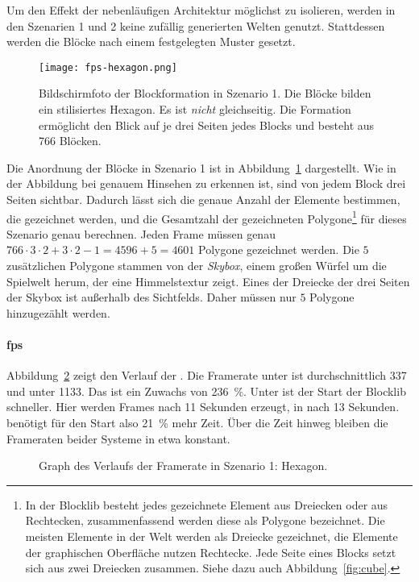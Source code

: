
Um den Effekt der nebenläufigen Architektur möglichst zu isolieren, werden in den Szenarien 1 und 2 keine zufällig generierten Welten genutzt. Stattdessen werden die Blöcke nach einem festgelegten Muster gesetzt.

\begin{figure}
	\centering
	\texttt{[image: fps-hexagon.png]}
	\caption[Bildschirmfoto der Blockformation in Szenario 1 der Performanceanalyse.]{Bildschirmfoto der Blockformation in Szenario 1. Die Blöcke bilden ein stilisiertes Hexagon. Es ist \emph{nicht} gleichseitig. Die Formation ermöglicht den Blick auf je drei Seiten jedes Blocks und besteht aus 766 Blöcken.}\label{fig:hexagon}
\end{figure}
Die Anordnung der Blöcke in Szenario 1 ist in Abbildung~\ref{fig:hexagon} dargestellt. Wie in der Abbildung bei genauem Hinsehen zu erkennen ist, sind von jedem Block drei Seiten sichtbar. Dadurch lässt sich die genaue Anzahl der Elemente bestimmen, die gezeichnet werden, und die Gesamtzahl der gezeichneten Polygone\footnote{In der Blocklib besteht jedes gezeichnete Element aus Dreiecken oder aus Rechtecken, zusammenfassend werden diese als Polygone bezeichnet. Die meisten Elemente in der Welt werden als Dreiecke gezeichnet, die Elemente der graphischen Oberfläche nutzen Rechtecke. Jede Seite eines Blocks setzt sich aus zwei Dreiecken zusammen. Siehe dazu auch Abbildung~\ref{fig:cube}.} für dieses Szenario genau berechnen. Jeden Frame müssen genau $766\cdot3\cdot2 + 3\cdot2-1 = 4596 +5 = 4601$ Polygone gezeichnet werden. Die $5$ zusätzlichen Polygone stammen von der \emph{Skybox}, einem großen Würfel um die Spielwelt herum, der eine Himmelstextur zeigt. Eines der Dreiecke der drei Seiten der Skybox ist außerhalb des Sichtfelds. Daher müssen nur $5$ Polygone hinzugezählt werden.


\paragraph{\ac{fps}} Abbildung~\ref{fig:seed-0-hexagon-fps} zeigt den Verlauf der \si{\fps}. Die Framerate unter \sysA{} ist durchschnittlich \SI{337}{\fps} und unter \sysB{} \SI{1133}{\fps}. Das ist ein Zuwachs von \SI{236}{\percent}. Unter \sysA{} ist der Start der Blocklib schneller. Hier werden Frames nach 11 Sekunden erzeugt, in \sysB{} nach 13 Sekunden. \sysB{} benötigt für den Start also \SI{21}{\percent} mehr Zeit. Über die Zeit hinweg bleiben die Frameraten beider Systeme in etwa konstant.
\begin{figure}[!htbp]
	\settowidth{}
	\caption{Graph des Verlaufs der Framerate in Szenario 1: Hexagon.}\label{fig:seed-0-hexagon-fps}
\end{figure}


